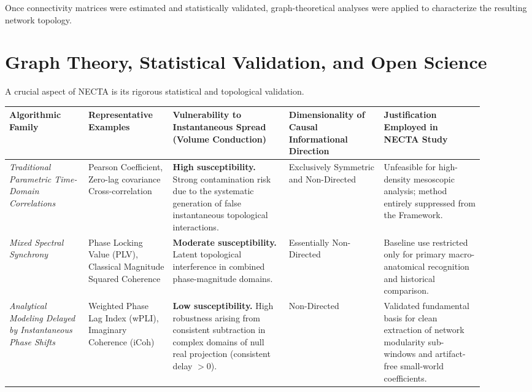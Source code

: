 Once connectivity matrices were estimated and statistically validated, graph-theoretical analyses were applied to characterize the resulting network topology.

\section{Graph Theory, Statistical Validation, and Open Science}
A crucial aspect of NECTA is its rigorous statistical and topological validation.

\begin{table}[H]
\centering
\renewcommand{\arraystretch}{1.4} %
\footnotesize %
\begin{tabular}{|>{\raggedright\arraybackslash}p{0.15\linewidth}|>{\raggedright\arraybackslash}p{0.16\linewidth}|>{\raggedright\arraybackslash}p{0.22\linewidth}|>{\raggedright\arraybackslash}p{0.18\linewidth}|>{\raggedright\arraybackslash}p{0.19\linewidth}|}
\hline
\textbf{Algorithmic Family} & \textbf{Representative Examples} & \textbf{Vulnerability to Instantaneous Spread (Volume Conduction)} & \textbf{Dimensionality of Causal Informational Direction} & \textbf{Justification Employed in NECTA Study} \\ \hline
\textit{Traditional Parametric Time-Domain Correlations} & Pearson Coefficient, Zero-lag covariance Cross-correlation & \textbf{High susceptibility.} Strong contamination risk due to the systematic generation of false instantaneous topological interactions. & Exclusively Symmetric and Non-Directed & Unfeasible for high-density mesoscopic analysis; method entirely suppressed from the Framework. \\ \hline
\textit{Mixed Spectral Synchrony} & Phase Locking Value (PLV), Classical Magnitude Squared Coherence & \textbf{Moderate susceptibility.} Latent topological interference in combined phase-magnitude domains. & Essentially Non-Directed & Baseline use restricted only for primary macro-anatomical recognition and historical comparison. \\ \hline
\textit{Analytical Modeling Delayed by Instantaneous Phase Shifts} & Weighted Phase Lag Index (wPLI), Imaginary Coherence (iCoh) & \textbf{Low susceptibility.} High robustness arising from consistent subtraction in complex domains of null real projection (consistent delay $>0$). & Non-Directed & Validated fundamental basis for clean extraction of network modularity sub-windows and artifact-free small-world coefficients. \\ \hline

\end{tabular}
\end{table}
